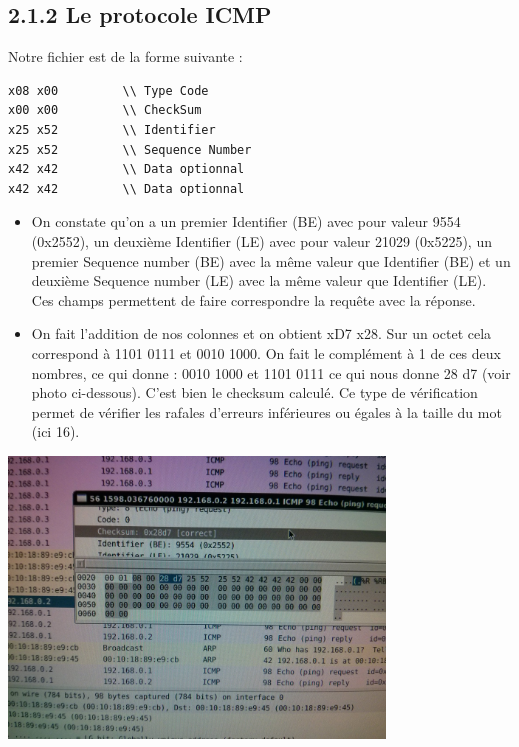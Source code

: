 \documentclass{article}
\begin{document}
\subsection*{2.1.2 Le protocole ICMP}

Notre fichier est de la forme suivante :
\begin{verbatim}
x08 x00			\\ Type Code
x00 x00			\\ CheckSum
x25 x52			\\ Identifier
x25 x52			\\ Sequence Number
x42 x42			\\ Data optionnal
x42 x42			\\ Data optionnal
\end{verbatim}

\begin{itemize}\renewcommand{\labelitemi}{$\bullet$}
	\item On constate qu'on a un premier Identifier (BE) avec pour valeur 9554 (0x2552), un deuxième Identifier (LE) avec pour valeur 21029 (0x5225), un premier Sequence number (BE) avec la même valeur que Identifier (BE) et un deuxième Sequence number (LE) avec la même valeur que Identifier (LE). Ces champs permettent de faire correspondre la requête avec la réponse.
	\item On fait l'addition de nos colonnes et on obtient xD7 x28. Sur un octet cela correspond à 1101 0111 et 0010 1000. On fait le complément à 1 de ces deux nombres, ce qui donne : 0010 1000 et 1101 0111 ce qui nous donne 28 d7 (voir photo ci-dessous). C'est bien le checksum calculé. Ce type de vérification permet de vérifier les rafales d'erreurs inférieures ou égales à la taille du mot (ici 16).
\end{itemize}

\includegraphics[width=10cm]{screen5.jpg}
\end{document}

